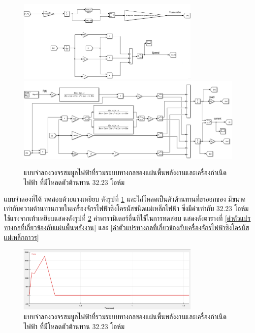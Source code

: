 \documentclass[11pt,a4paper]{article}
\begin{document}
\begin{figure}[H]
    \begin{center}
        \includegraphics[width=0.8\textwidth]{sim_elecmech_2.png}
        \includegraphics[width=1\textwidth]{sim_elecmech_3.png}
    \end{center}
    \caption{แบบจำลองวงจรสมมูลไฟฟ้าที่รวมระบบทางกลของแผ่นพื้นพลังงานและเครื่องกำเนิดไฟฟ้า ที่มีโหลดตัวต้านทาน 32.23 โอห์ม}
    \label{sim_elecmech}
\end{figure}

แบบจำลองที่ได้ ทดสอบด้วยแรงเหยียบ ดังรูปที่ \ref{sim_elecmech} และใส่โหลดเป็นตัวต้านทานที่ขาออกของ มีขนาดเท่ากับความต้านทานภายในเครื่องจักรไฟฟ้าซิงโครนัสชนิดแม่เหล็กไฟฟ้า ซึ่งมีค่าเท่ากับ 32.23 โอห์ม ใช้แรงจากเท้าเหยียบแสดงดังรูปที่ \ref{force_sim} ค่าพารามิเตอร์อื่นที่ใช้ในการทดสอบ \cite{GpH:01} แสดงดังตารางที่ \ref{ค่าตัวแปรทางกลที่เกี่ยวข้องกับแผ่นพื้นพลังงาน} และ \ref{ค่าตัวแปรทางกลที่เกี่ยวข้องกับเครื่องจักรไฟฟ้าซิงโครนัสแม่เหล็กถาวร}
\begin{figure}[H]
    \begin{center}
        \includegraphics[width=0.8\textwidth]{force_sim.png}
    \end{center}
    \caption{แบบจำลองวงจรสมมูลไฟฟ้าที่รวมระบบทางกลของแผ่นพื้นพลังงานและเครื่องกำเนิดไฟฟ้า ที่มีโหลดตัวต้านทาน 32.23 โอห์ม}
    \label{force_sim}
\end{figure}
\end{document}
